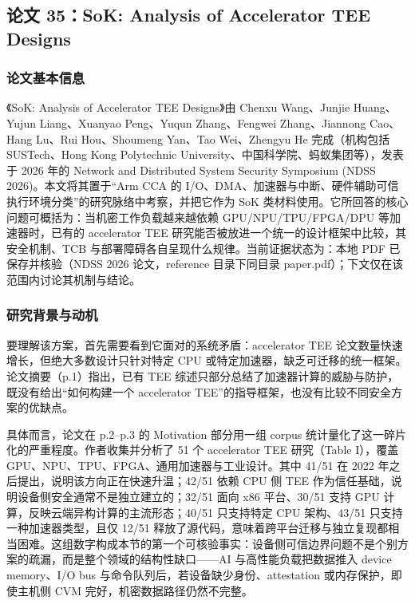 \documentclass[11pt]{ctexart}
\begin{document}
\subsection{论文 35：SoK: Analysis of Accelerator TEE Designs}
\subsubsection{论文基本信息}
《SoK: Analysis of Accelerator TEE Designs》由 Chenxu Wang、Junjie Huang、Yujun Liang、Xuanyao Peng、Yuqun Zhang、Fengwei Zhang、Jiannong Cao、Hang Lu、Rui Hou、Shoumeng Yan、Tao Wei、Zhengyu He 完成（机构包括 SUSTech、Hong Kong Polytechnic University、中国科学院、蚂蚁集团等），发表于 2026 年的 Network and Distributed System Security Symposium (NDSS 2026)。本文将其置于``Arm CCA 的 I/O、DMA、加速器与中断、硬件辅助可信执行环境分类''的研究脉络中考察，并把它作为 SoK 类材料使用。它所回答的核心问题可概括为：当机密工作负载越来越依赖 GPU/NPU/TPU/FPGA/DPU 等加速器时，已有的 accelerator TEE 研究能否被放进一个统一的设计框架中比较，其安全机制、TCB 与部署障碍各自呈现什么规律。当前证据状态为：本地 PDF 已保存并核验（NDSS 2026 论文，reference 目录下同目录 paper.pdf）；下文仅在该范围内讨论其机制与结论。\cite{sok-tee}\par
\subsubsection{研究背景与动机}
要理解该方案，首先需要看到它面对的系统矛盾：accelerator TEE 论文数量快速增长，但绝大多数设计只针对特定 CPU 或特定加速器，缺乏可迁移的统一框架。论文摘要（p.1）指出，已有 TEE 综述只部分总结了加速器计算的威胁与防护，既没有给出``如何构建一个 accelerator TEE''的指导框架，也没有比较不同安全方案的优缺点。\par
具体而言，论文在 p.2--p.3 的 Motivation 部分用一组 corpus 统计量化了这一碎片化的严重程度。作者收集并分析了 51 个 accelerator TEE 研究（Table I），覆盖 GPU、NPU、TPU、FPGA、通用加速器与工业设计。其中 41/51 在 2022 年之后提出，说明该方向正在快速升温；42/51 依赖 CPU 侧 TEE 作为信任基础，说明设备侧安全通常不是独立建立的；32/51 面向 x86 平台、30/51 支持 GPU 计算，反映云端异构计算的主流形态；40/51 只支持特定 CPU 架构、43/51 只支持一种加速器类型，且仅 12/51 释放了源代码，意味着跨平台迁移与独立复现都相当困难。这组数字构成本节的第一个可核验事实：设备侧可信边界问题不是个别方案的疏漏，而是整个领域的结构性缺口——AI 与高性能负载把数据推入 device memory、I/O bus 与命令队列后，若设备缺少身份、attestation 或内存保护，即使主机侧 CVM 完好，机密数据路径仍然不完整。\par
\end{document}
